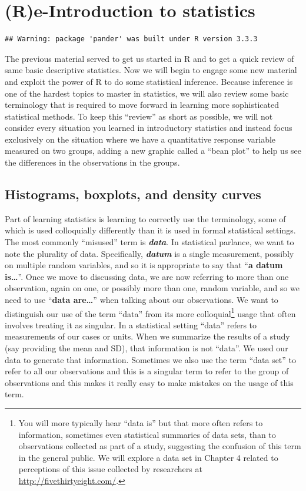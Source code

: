 \documentclass[]{book}
\let\rmarkdownfootnote\footnote%
\def\footnote{\protect\rmarkdownfootnote}
\begin{document}
\chapter{(R)e-Introduction to statistics}\label{chapter2}

\begin{verbatim}
## Warning: package 'pander' was built under R version 3.3.3
\end{verbatim}

The previous material served to get us started in R and to get a quick
review of same basic descriptive statistics. Now we will begin to engage
some new material and exploit the power of R to do some statistical
inference. Because inference is one of the hardest topics to master in
statistics, we will also review some basic terminology that is required
to move forward in learning more sophisticated statistical methods. To
keep this ``review'' as short as possible, we will not consider every
situation you learned in introductory statistics and instead focus
exclusively on the situation where we have a quantitative response
variable measured on two groups, adding a new graphic called a ``bean
plot'' to help us see the differences in the observations in the groups.

\section{Histograms, boxplots, and density curves}\label{section2-1}

Part of learning statistics is learning to correctly use the
terminology, some of which is used colloquially differently than it is
used in formal statistical settings. The most commonly ``misused'' term
is \textbf{\emph{data}}. In statistical parlance, we want to note the
plurality of data. Specifically, \textbf{\emph{datum}} is a single
measurement, possibly on multiple random variables, and so it is
appropriate to say that ``\textbf{a datum is\ldots{}}''. Once we move to
discussing data, we are now referring to more than one observation,
again on one, or possibly more than one, random variable, and so we need
to use ``\textbf{data are\ldots{}}'' when talking about our
observations. We want to distinguish our use of the term ``data'' from
its more colloquial\footnote{You will more typically hear ``data is''
  but that more often refers to information, sometimes even statistical
  summaries of data sets, than to observations collected as part of a
  study, suggesting the confusion of this term in the general public. We
  will explore a data set in Chapter 4 related to perceptions of this
  issue collected by researchers at \url{http://fivethirtyeight.com/}.}
usage that often involves treating it as singular. In a statistical
setting ``data'' refers to measurements of our cases or units. When we
summarize the results of a study (say providing the mean and SD), that
information is not ``data''. We used our data to generate that
information. Sometimes we also use the term ``data set'' to refer to all
our observations and this is a singular term to refer to the group of
observations and this makes it really easy to make mistakes on the usage
of this term.
\end{document}
